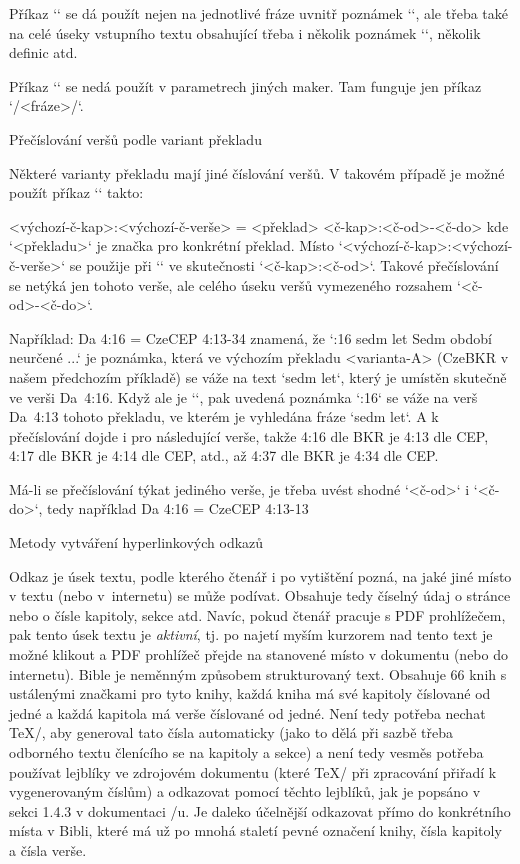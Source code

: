 Příkaz `\switch` se dá použít nejen na jednotlivé fráze uvnitř poznámek
`\Note`, ale třeba také na celé úseky vstupního textu obsahující třeba i
několik poznámek `\Note`, několik definic atd.

Příkaz `\switch` se nedá použít v parametrech jiných maker. Tam funguje jen
příkaz `\x/<fráze>/`.

\secc Přečíslování veršů podle variant překladu

\mnote{\code{\\renum}}
Některé varianty překladu mají jiné číslování veršů. V takovém případě je
možné použít příkaz `\renum` takto:

\begtt
{} <výchozí-č-kap>:<výchozí-č-verše> = <překlad> <č-kap>:<č-od>-<č-do>
\endtt
kde `<překladu>` je značka pro konkrétní překlad.
Místo `<výchozí-č-kap>:<výchozí-č-verše>` se použije při `\def\tmark{<překlad>}`
ve skutečnosti `<č-kap>:<č-od>`.
Takové přečíslování se netýká jen
tohoto verše, ale celého úseku veršů vymezeného rozsahem `<č-od>-<č-do>`.

Například:
\begtt
\renum Da 4:16 = CzeCEP 4:13-34
\endtt
znamená, že `:16 {sedm let} Sedm období neurčené ...` je poznámka,
která ve výchozím překladu <varianta-A> (CzeBKR v našem předchozím příkladě)
se váže na text `sedm let`, který je umístěn skutečně ve verši Da~4:16.
Když ale je `\def\tmark{CzeCEP}`, pak uvedená poznámka `:16`
se váže na verš Da~4:13 tohoto překladu, ve kterém je vyhledána fráze
`sedm let`. A k přečíslování dojde i pro následující verše, takže
4:16 dle BKR je 4:13 dle CEP, 4:17 dle BKR je 4:14 dle CEP, atd., až
4:37 dle BKR je 4:34 dle CEP.

Má-li se přečíslování týkat jediného verše, je třeba uvést shodné
`<č-od>` i `<č-do>`, tedy například
\begtt
\renum Da 4:16 = CzeCEP 4:13-13
\endtt

\sec[odkazy] Metody vytváření hyperlinkových odkazů

Odkaz je úsek textu, podle kterého čtenář i po vytištění pozná, na jaké jiné místo
v textu (nebo v~internetu) se může podívat. Obsahuje tedy číselný údaj o
stránce nebo o čísle kapitoly, sekce atd. Navíc, pokud čtenář pracuje s PDF
prohlížečem, pak tento úsek textu je {\em aktivní}, tj. po najetí myším
kurzorem nad tento text je možné klikout a PDF prohlížeč přejde na stanovené
místo v dokumentu (nebo do internetu). Bible je neměnným způsobem
strukturovaný text. Obsahuje 66 knih s ustálenými značkami pro tyto knihy,
každá kniha má své kapitoly číslované od jedné a každá kapitola má verše
číslované od jedné. Není tedy potřeba nechat \TeX/, aby generoval tato čísla
automaticky (jako to dělá při sazbě třeba odborného textu členícího se na
kapitoly a sekce) a není tedy vesměs potřeba používat lejblíky ve zdrojovém
dokumentu (které \TeX/ při zpracování přiřadí k vygenerovaným číslům) a odkazovat pomocí
těchto lejblíků, jak je popsáno v sekci 1.4.3 v dokumentaci \OpTeX/u. Je
daleko účelnější odkazovat přímo do konkrétního místa v Bibli, které má už
po mnohá staletí pevné označení knihy, čísla kapitoly a čísla verše.

